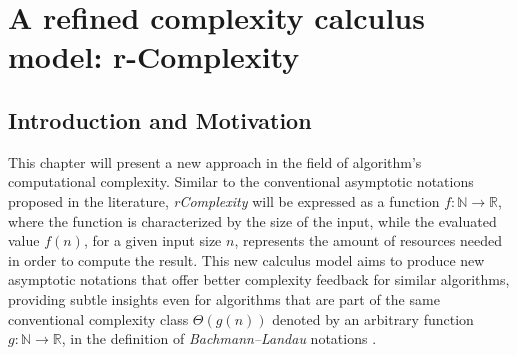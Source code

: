 
\chapter{A refined complexity calculus model: r-Complexity }




\section{Introduction and Motivation}
This chapter will present a new approach in the field of algorithm's computational complexity. Similar to the conventional asymptotic notations proposed in the literature,  \textit{rComplexity} will be expressed as a function $f:\mathbb{N}\longrightarrow\mathbb{R}$, where the function is characterized by the size of the input, while the evaluated value $f(n)$, for a given input size $n$, represents the amount of resources needed in order to compute the result. 
This new calculus model aims to produce new asymptotic notations that offer better complexity feedback for similar algorithms, providing subtle insights even for algorithms that are part of the same conventional complexity class $\Theta(g(n))$ denoted by an arbitrary function $g:\mathbb{N}\longrightarrow\mathbb{R}$, in the definition of \textit{Bachmann–Landau} notations .

